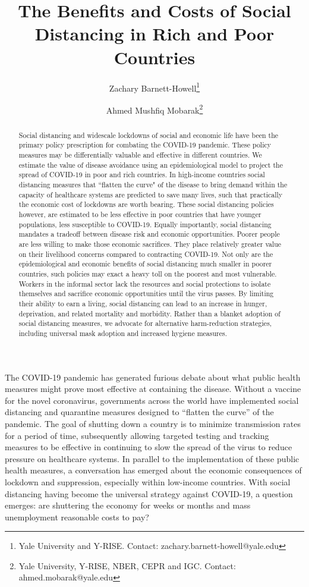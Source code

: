 \documentclass[11pt]{article}
\author{Zachary Barnett-Howell\thanks{Yale University and Y-RISE. Contact: zachary.barnett-howell@yale.edu} \and Ahmed Mushfiq Mobarak\thanks{Yale University, Y-RISE, NBER, CEPR and IGC. Contact: ahmed.mobarak@yale.edu} }
\title{The Benefits and Costs of Social Distancing in Rich and Poor Countries}
\begin{document}
\maketitle

\begin{abstract}
    
Social distancing and widescale lockdowns of social and economic life have been the primary policy prescription for combating the COVID-19 pandemic. These policy measures may be differentially valuable and effective in different countries. We estimate the value of disease avoidance using an epidemiological model to project the spread of COVID-19 in poor and rich countries. In high-income countries social distancing measures that ``flatten the curve" of the disease to bring demand within the capacity of healthcare systems are predicted to save many lives, such that practically the economic cost of lockdowns are  worth bearing. These social distancing policies however, are estimated to be less effective in poor countries that have younger populations, less susceptible to COVID-19. Equally importantly, social distancing mandates a tradeoff between disease risk and economic opportunities. Poorer people are less willing to make those economic sacrifices. They place relatively greater value on their livelihood concerns compared to contracting COVID-19. Not only are the epidemiological and economic benefits of social distancing much smaller in poorer countries, such policies may exact a heavy toll on the poorest and most vulnerable. Workers in the informal sector lack the resources and social protections to isolate themselves and sacrifice economic opportunities until the virus passes. By limiting their ability to earn a living, social distancing can lead to an increase in hunger, deprivation, and related mortality and morbidity. Rather than a blanket adoption of social distancing measures, we advocate for alternative harm-reduction strategies, including universal mask adoption and increased hygiene measures.

\end{abstract}


\doublespacing

The COVID-19 pandemic has generated furious debate about what public health measures might prove most effective at containing the disease. Without a vaccine for the novel coronavirus, governments across the world have implemented social distancing and quarantine measures  designed to ``flatten the curve'' of the pandemic. The goal of shutting down a country is to minimize transmission rates for a period of time, subsequently allowing targeted testing and tracking measures to be effective in continuing to slow the spread of the virus to reduce pressure on healthcare systems. In parallel to the implementation of these public health measures, a conversation has emerged about the economic consequences of lockdown and suppression, especially within low-income countries. With social distancing having become the universal strategy against COVID-19, a question emerges: are shuttering the economy for weeks or months and mass unemployment reasonable costs to pay? 
\end{document}
